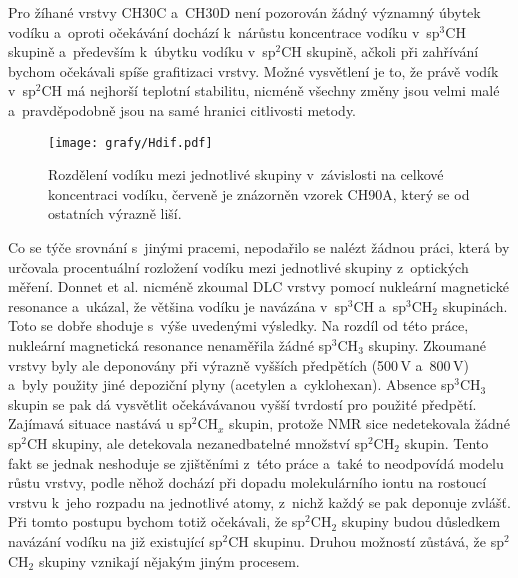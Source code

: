 Pro žíhané vrstvy CH30C a~CH30D není pozorován žádný významný úbytek vodíku a~oproti očekávání dochází k~nárůstu koncentrace vodíku v~sp$^3$CH skupině a~především k~úbytku vodíku v~sp$^2$CH skupině, ačkoli při zahřívání bychom očekávali spíše grafitizaci vrstvy. Možné vysvětlení je to, že právě vodík v~sp$^2$CH má nejhorší teplotní stabilitu, nicméně všechny změny jsou velmi malé a~pravděpodobně jsou na samé hranici citlivosti metody.

\begin{figure}[tbhp]
	\texttt{[image: grafy/Hdif.pdf]}
	\caption{Rozdělení vodíku mezi jednotlivé skupiny v~závislosti na celkové koncentraci vodíku, červeně je znázorněn vzorek CH90A, který se od ostatních výrazně liší.}
	\label{Hdif}
\end{figure}

Co se týče srovnání s~jinými pracemi, nepodařilo se nalézt žádnou práci, která by určovala procentuální rozložení vodíku mezi jednotlivé skupiny z~optických měření. Donnet et al. \cite{Donnet1999} nicméně zkoumal DLC vrstvy pomocí nukleární magnetické resonance a~ukázal, že většina vodíku je navázána v~sp$^3$CH a~sp$^3$CH$_2$ skupinách. 
Toto se dobře shoduje s~výše uvedenými výsledky. Na rozdíl od této práce, nukleární magnetická resonance nenaměřila žádné sp$^3$CH$_3$ skupiny. Zkoumané vrstvy byly ale deponovány při výrazně vyšších předpětích (500\,V a~800\,V) a~byly použity jiné depoziční plyny (acetylen a~cyklohexan). Absence sp$^3$CH$_3$ skupin se pak dá vysvětlit očekávávanou vyšší tvrdostí pro použité předpětí. Zajímavá situace nastává u sp$^2$CH$_x$ skupin, protože NMR sice nedetekovala žádné sp$^2$CH skupiny, ale detekovala nezanedbatelné množství sp$^2$CH$_2$ skupin. 
Tento fakt se jednak neshoduje se zjištěními z~této práce a~také to neodpovídá modelu růstu vrstvy, podle něhož dochází při dopadu molekulárního iontu na rostoucí vrstvu k~jeho rozpadu na jednotlivé atomy, z~nichž každý se pak deponuje zvlášť. Při tomto postupu bychom totiž očekávali, že sp$^2$CH$_2$ skupiny budou důsledkem navázání vodíku na již existující sp$^2$CH skupinu. Druhou možností zůstává, že sp$^2$CH$_2$ skupiny vznikají nějakým jiným procesem.

\cleardoublepage
